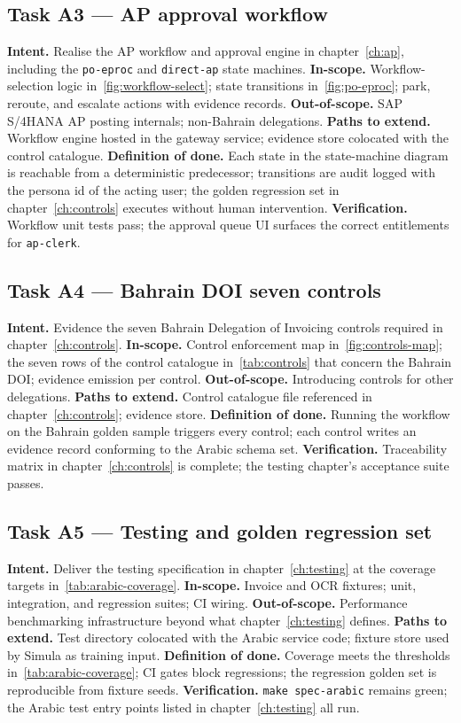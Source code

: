 \documentclass[11pt,a4paper,twoside]{report}
\begin{document}
\subsection*{Task A3 --- AP approval workflow}
\textbf{Intent.} Realise the AP workflow and approval engine in
chapter~\ref{ch:ap}, including the \texttt{po-eproc} and
\texttt{direct-ap} state machines.
\textbf{In-scope.} Workflow-selection logic in~\ref{fig:workflow-select};
state transitions in~\ref{fig:po-eproc}; park, reroute, and escalate
actions with evidence records.
\textbf{Out-of-scope.} SAP S/4HANA AP posting internals;
non-Bahrain delegations.
\textbf{Paths to extend.} Workflow engine hosted in the gateway
service; evidence store colocated with the control catalogue.
\textbf{Definition of done.} Each state in the state-machine diagram
is reachable from a deterministic predecessor; transitions are audit
logged with the persona id of the acting user; the golden regression
set in chapter~\ref{ch:controls} executes without human intervention.
\textbf{Verification.} Workflow unit tests pass; the approval queue
UI surfaces the correct entitlements for \texttt{ap-clerk}.

\subsection*{Task A4 --- Bahrain DOI seven controls}
\textbf{Intent.} Evidence the seven Bahrain Delegation of Invoicing
controls required in chapter~\ref{ch:controls}.
\textbf{In-scope.} Control enforcement map in~\ref{fig:controls-map};
the seven rows of the control catalogue in~\ref{tab:controls} that
concern the Bahrain DOI; evidence emission per control.
\textbf{Out-of-scope.} Introducing controls for other delegations.
\textbf{Paths to extend.} Control catalogue file referenced in
chapter~\ref{ch:controls}; evidence store.
\textbf{Definition of done.} Running the workflow on the Bahrain
golden sample triggers every control; each control writes an
evidence record conforming to the Arabic schema set.
\textbf{Verification.} Traceability matrix in chapter~\ref{ch:controls}
is complete; the testing chapter's acceptance suite passes.

\subsection*{Task A5 --- Testing and golden regression set}
\textbf{Intent.} Deliver the testing specification in
chapter~\ref{ch:testing} at the coverage targets
in~\ref{tab:arabic-coverage}.
\textbf{In-scope.} Invoice and OCR fixtures; unit, integration, and
regression suites; CI wiring.
\textbf{Out-of-scope.} Performance benchmarking infrastructure beyond
what chapter~\ref{ch:testing} defines.
\textbf{Paths to extend.} Test directory colocated with the Arabic
service code; fixture store used by Simula as training input.
\textbf{Definition of done.} Coverage meets the thresholds
in~\ref{tab:arabic-coverage}; CI gates block regressions; the
regression golden set is reproducible from fixture seeds.
\textbf{Verification.} \texttt{make spec-arabic} remains green; the
Arabic test entry points listed in chapter~\ref{ch:testing} all run.
\end{document}
